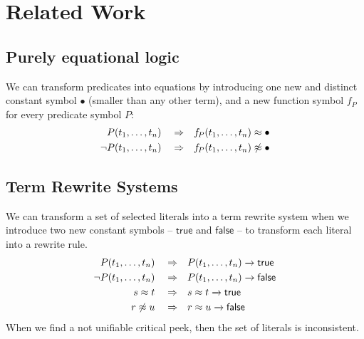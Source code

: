 
\chapter{Related Work}


\section{Purely equational logic}

We can transform predicates into equations
by introducing one new and distinct constant symbol \( \bullet \) (smaller than any other term),
and a new function symbol \( f\!_P \) for every predicate symbol \( P \):
\begin{align*}
	P(t_1,\ldots,t_n) \quad\Rightarrow&\quad f\!_P(t_1,\ldots,t_n) \approx \bullet \\
	\lnot P(t_1,\ldots,t_n) \quad\Rightarrow&\quad f\!_P(t_1,\ldots,t_n) \not\approx \bullet
\end{align*}

\section{Term Rewrite Systems}

We can transform a set of selected literals into a term rewrite system
when we introduce two new constant symbols -- \( \mathsf{true} \) and \( \mathsf{false} \) --
to transform each literal into a rewrite rule.
\begin{align*}
P(t_1,\ldots,t_n) \quad\Rightarrow &\quad P(t_1,\ldots,t_n) \xrightarrow[{}]{} \mathsf{true}
\\
\lnot P(t_1,\ldots,t_n) \quad\Rightarrow &\quad P(t_1,\ldots,t_n) \xrightarrow[{}]{} \mathsf{false}
\\
s \approx t \quad\Rightarrow&\quad s \approx t\xrightarrow[{}]{} \mathsf{true}
\\
r \not\approx u \quad\Rightarrow&\quad r \approx u\xrightarrow[{}]{}  \mathsf{false}
\end{align*}
When we find a not unifiable critical peek, then the set of literals is inconsistent.

